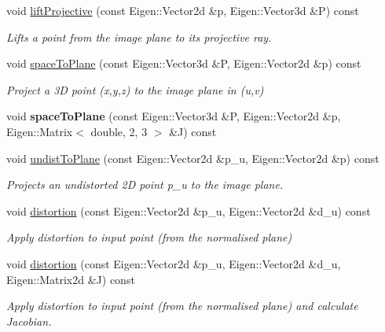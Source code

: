 \begin{DoxyCompactItemize}
void \hyperlink{classcamodocal_1_1PinholeCamera_a8a557882a34c5269f6254df6e1d9bb4f}{lift\+Projective} (const Eigen\+::\+Vector2d \&p, Eigen\+::\+Vector3d \&P) const
\begin{DoxyCompactList}\small\item\em Lifts a point from the image plane to its projective ray. \end{DoxyCompactList}\item 
void \hyperlink{classcamodocal_1_1PinholeCamera_a27e7b78d07e19f11d1ca0d3dc2c48b73}{space\+To\+Plane} (const Eigen\+::\+Vector3d \&P, Eigen\+::\+Vector2d \&p) const
\begin{DoxyCompactList}\small\item\em Project a 3D point ({\itshape x},{\itshape y},{\itshape z}) to the image plane in ({\itshape u},{\itshape v}) \end{DoxyCompactList}\item 
\mbox{\label{classcamodocal_1_1PinholeCamera_a5cb4ec3347a9718ff963587c4f07515a}} 
void {\bfseries space\+To\+Plane} (const Eigen\+::\+Vector3d \&P, Eigen\+::\+Vector2d \&p, Eigen\+::\+Matrix$<$ double, 2, 3 $>$ \&J) const
\item 
void \hyperlink{classcamodocal_1_1PinholeCamera_a70cc5acd48df30c2f7a2f84b35369a39}{undist\+To\+Plane} (const Eigen\+::\+Vector2d \&p\+\_\+u, Eigen\+::\+Vector2d \&p) const
\begin{DoxyCompactList}\small\item\em Projects an undistorted 2D point p\+\_\+u to the image plane. \end{DoxyCompactList}\item 
void \hyperlink{classcamodocal_1_1PinholeCamera_a0e667305df17c681a6550cd0addfcaab}{distortion} (const Eigen\+::\+Vector2d \&p\+\_\+u, Eigen\+::\+Vector2d \&d\+\_\+u) const
\begin{DoxyCompactList}\small\item\em Apply distortion to input point (from the normalised plane) \end{DoxyCompactList}\item 
void \hyperlink{classcamodocal_1_1PinholeCamera_a36fbf4d157d3dafd87dc52c8f664bcbc}{distortion} (const Eigen\+::\+Vector2d \&p\+\_\+u, Eigen\+::\+Vector2d \&d\+\_\+u, Eigen\+::\+Matrix2d \&J) const
\begin{DoxyCompactList}\small\item\em Apply distortion to input point (from the normalised plane) and calculate Jacobian. \end{DoxyCompactList}\item 

\end{DoxyCompactItemize}
